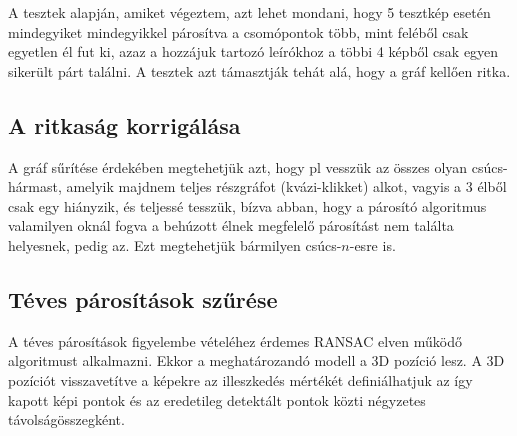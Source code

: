 	A tesztek alapján, amiket végeztem, azt lehet mondani, hogy 5 tesztkép esetén mindegyiket mindegyikkel párosítva a csomópontok több, mint feléből csak egyetlen él fut ki, azaz a hozzájuk tartozó leírókhoz a többi 4 képből csak egyen sikerült párt találni. A tesztek azt támasztják tehát alá, hogy a gráf kellően ritka.
	
\subsection{A ritkaság korrigálása}	
	\label{extension_doc}
	
	A gráf sűrítése érdekében megtehetjük azt, hogy pl vesszük az összes olyan csúcs-hármast, amelyik majdnem teljes részgráfot (kvázi-klikket) alkot, vagyis a 3 élből csak egy hiányzik, és teljessé tesszük, bízva abban, hogy a párosító algoritmus valamilyen oknál fogva a behúzott élnek megfelelő párosítást nem találta helyesnek, pedig az. Ezt megtehetjük bármilyen csúcs-$n$-esre is.
	
\subsection{Téves párosítások szűrése}

	A téves párosítások figyelembe vételéhez érdemes RANSAC elven működő algoritmust alkalmazni. Ekkor a meghatározandó modell a 3D pozíció lesz. A 3D pozíciót visszavetítve a képekre az illeszkedés mértékét definiálhatjuk az így kapott képi pontok és az eredetileg detektált pontok közti négyzetes távolságösszegként.